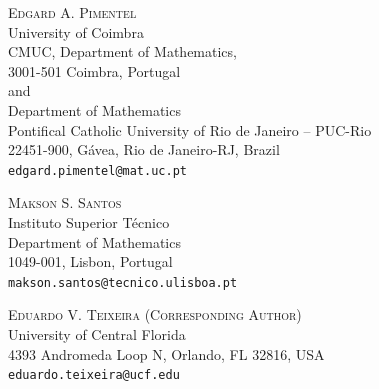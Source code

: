 \documentclass[10pt]{article} %
\begin{document}
\vspace{.3in}

\noindent\textsc{Edgard A. Pimentel}\\
University of Coimbra\\
CMUC, Department of Mathematics,\\
3001-501 Coimbra, Portugal\\
and \\
Department of Mathematics\\
Pontifical Catholic University of Rio de Janeiro -- PUC-Rio\\
22451-900, G\'avea, Rio de Janeiro-RJ, Brazil\\
\noindent\texttt{edgard.pimentel@mat.uc.pt}


\bigskip

\noindent\textsc{Makson S. Santos}\\
Instituto Superior T\'ecnico\\Department of Mathematics\\
1049-001, Lisbon, Portugal\\
\noindent\texttt{makson.santos@tecnico.ulisboa.pt}


\bigskip

\noindent\textsc{Eduardo V. Teixeira (Corresponding Author)}\\
University of Central Florida\\
4393 Andromeda Loop N, Orlando, FL 32816, USA\\
\noindent\texttt{eduardo.teixeira@ucf.edu}
\end{document}
